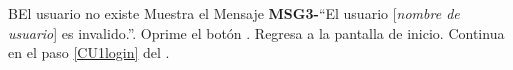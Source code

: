 		\begin{UCtrayectoriaA}{B}{El usuario no existe}
			\UCpaso  Muestra el Mensaje {\bf MSG3-}``El usuario [{\em nombre de usuario}] es invalido.''.
			\UCpaso[\UCactor] Oprime el botón .
			\UCpaso Regresa a la pantalla de inicio. 
			\UCpaso Continua en el paso \ref{CU1login} del .
		\end{UCtrayectoriaA}


		
